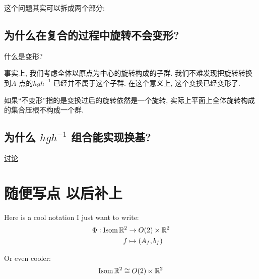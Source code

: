 \documentclass{ctexrep}
\DeclareMathOperator{\Isom}{\mathrm{Isom}}
\begin{document}
这个问题其实可以拆成两个部分:
\subsection{为什么在复合的过程中旋转不会变形?}
什么是变形?

事实上, 我们考虑全体以原点为中心的旋转构成的子群. 我们不难发现把旋转转换到\(A\) 点的\(hgh^{-1}\)
已经并不属于这个子群. 在这个意义上, 这个变换已经变形了.

如果``不变形''指的是变换过后的旋转依然是一个旋转, 实际上平面上全体旋转构成的集合压根不构成一个群.

\subsection{为什么 \(hgh^{-1}\) 组合能实现换基?}

\href{https://math.stackexchange.com/questions/11971/intuition-behind-conjugation-in-group-theory}{讨论}

\section{随便写点 以后补上}
Here is a cool notation I just want to write:
\begin{align*}
    \Phi:\Isom \R^{2} &\to O(2) \times \R^{2} \\
    f &\mapsto (A_{f}, b_{f}) \\
\end{align*}

Or even cooler:
\[
    \Isom \R^{2} \cong O(2) \ltimes \R^{2}
\]


\end{document}
